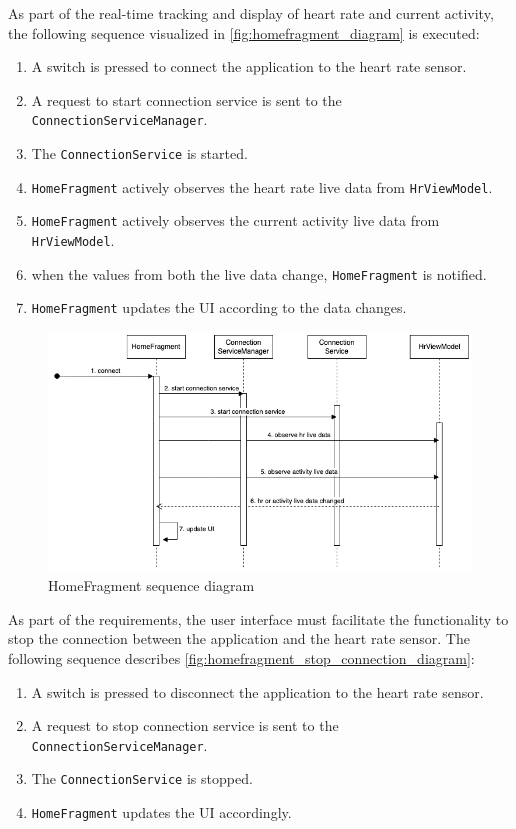 As part of the real-time tracking and display of heart rate and current activity, the following sequence visualized in \autoref{fig:homefragment_diagram} is executed:
\begin{enumerate}
    \item A switch is pressed to connect the application to the heart rate sensor.
    \item A request to start connection service is sent to the \texttt{ConnectionServiceManager}.
    \item The \texttt{ConnectionService} is started.
    \item \texttt{HomeFragment} actively observes the heart rate live data from \texttt{HrViewModel}.
    \item \texttt{HomeFragment} actively observes the current activity live data from \texttt{HrViewModel}.
    \item when the values from both the live data change, \texttt{HomeFragment} is notified.
    \item \texttt{HomeFragment} updates the UI according to the data changes.

\end{enumerate}

\begin{figure}[H]
    \centering
    \includegraphics[width=1\textwidth]{diagrams/hr-broadcast-homefragment.drawio.png}
    \caption{HomeFragment sequence diagram}
    \label{fig:homefragment_diagram}
\end{figure}

As part of the requirements, the user interface must facilitate the functionality to stop the connection between the application and the heart rate sensor. 
The following sequence describes \autoref{fig:homefragment_stop_connection_diagram}:
\begin{enumerate}
    \item A switch is pressed to disconnect the application to the heart rate sensor.
    \item A request to stop connection service is sent to the \texttt{ConnectionServiceManager}.
    \item The \texttt{ConnectionService} is stopped.
    \item \texttt{HomeFragment} updates the UI accordingly.
\end{enumerate}


